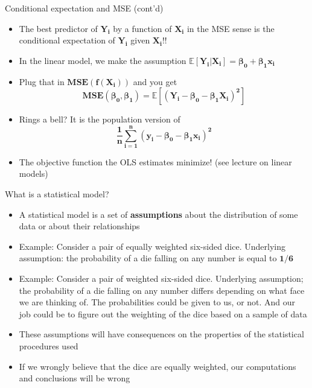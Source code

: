 \documentclass[
  ignorenonframetext,
  aspectratio=169]{beamer}
\providecommand{\tightlist}{%
  \setlength{\itemsep}{0pt}\setlength{\parskip}{0pt}}
\begin{document}
\begin{frame}{Conditional expectation and MSE (cont'd)}
\protect\hypertarget{conditional-expectation-and-mse-contd-2}{}
\begin{itemize}
\item
  The best predictor of \(\bm{Y_i}\) by a function of \(\bm{X_i}\) in
  the MSE sense is the conditional expectation of \(\bm{Y_i}\) given
  \(\bm{X_i}\)!!
\item
  In the linear model, we make the assumption
  \(\bm{\mathbb{E}[Y_i|X_i] = \beta_0 + \beta_1 x_i}\)
\item
  Plug that in \(\bm{MSE(f(X_i))}\) and you get \[
  \bm{MSE(\beta_0, \beta_1)= \mathbb{E}[(Y_i - \beta_0 - \beta_1 X_i)^2]}
  \]
\item
  Rings a bell? It is the population version of \[
  \bm{\frac{1}{n} \sum_{i=1}^n (y_i - \beta_0 - \beta_1 x_i)^2}
  \]
\item
  The objective function the OLS estimates minimize! (see lecture on
  linear models)
\end{itemize}
\end{frame}

\begin{frame}{What is a statistical model?}
\protect\hypertarget{what-is-a-statistical-model}{}
\label{statmod}

\begin{itemize}
\tightlist
\item
  A statistical model is a set of \textbf{assumptions} about the
  distribution of some data or about their relationships
\item
  Example: Consider a pair of equally weighted six-sided dice.
  Underlying assumption: the probability of a die falling on any number
  is equal to \(\bm{1/6}\)
\item
  Example: Consider a pair of weighted six-sided dice. Underlying
  assumption; the probability of a die falling on any number differs
  depending on what face we are thinking of. The probabilities could be
  given to us, or not. And our job could be to figure out the weighting
  of the dice based on a sample of data
\item
  These assumptions will have consequences on the properties of the
  statistical procedures used
\item
  If we wrongly believe that the dice are equally weighted, our
  computations and conclusions will be wrong
\end{itemize}
\end{frame}
\end{document}

